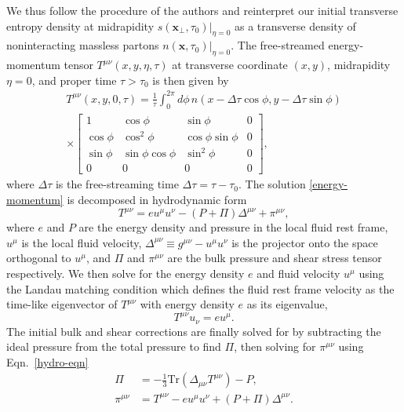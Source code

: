 \documentclass[aps,prc,reprint,amsmath,nofootinbib]{revtex4-1}
\begin{document}
We thus follow the procedure of the authors and reinterpret our initial transverse entropy density at midrapidity $s(\mathbf{x_\perp}, \tau_0)\vert_{\eta=0}$ as a transverse density of noninteracting massless partons $n(\mathbf{x}, \tau_0)\vert_{\eta=0}$.
The free-streamed energy-momentum tensor $T^{\mu\nu}(x, y, \eta, \tau)$ at transverse coordinate $(x, y)$, midrapidity $\eta=0$, and proper time $\tau > \tau_0$ is then given by
\begin{multline}
  \label{energy-momentum}
  T^{\mu\nu}(x, y, 0, \tau) = \frac{1}{\tau} \int_{0}^{2\pi} d\phi\, n(x - \Delta \tau \cos \phi, y - \Delta \tau \sin \phi) \\ \times
  \begin{bmatrix}
    1 & \cos\phi & \sin\phi  & 0\\
    \cos\phi & \cos^2\phi & \cos\phi\sin\phi & 0 \\
    \sin\phi & \sin\phi \cos\phi & \sin^2\phi & 0\\
    0 & 0 & 0 & 0
  \end{bmatrix},
\end{multline}
where $\Delta\tau$ is the free-streaming time $\Delta\tau = \tau - \tau_0$.
The solution \eqref{energy-momentum} is decomposed in hydrodynamic form
\begin{equation}
  \label{hydro-eqn}
  T^{\mu\nu} = e u^\mu u^\nu - (P + \Pi) \Delta^{\mu\nu} + \pi^{\mu\nu},
\end{equation}
where $e$ and $P$ are the energy density and pressure in the local fluid rest frame, $u^\mu$ is the local fluid velocity, ${\Delta^{\mu\nu} \equiv g^{\mu\nu} - u^\mu u^\nu}$ is the projector onto the space orthogonal to $u^\mu$, and $\Pi$ and $\pi^{\mu\nu}$ are the bulk pressure and shear stress tensor respectively.
We then solve for the energy density $e$ and fluid velocity $u^\mu$ using the Landau matching condition which defines the fluid rest frame velocity as the time-like eigenvector of $T^{\mu\nu}$ with energy density $e$ as its eigenvalue,
\begin{equation}
  T^{\mu\nu} u_\nu = e u^\mu.
\end{equation}
The initial bulk and shear corrections are finally solved for by subtracting the ideal pressure from the total pressure to find $\Pi$, then solving for $\pi^{\mu\nu}$ using Eqn.~\eqref{hydro-eqn}
\begin{align}
  \Pi &= -\frac{1}{3} \mathrm{Tr}(\Delta_{\mu\nu} T^{\mu\nu}) - P,\\
  \pi^{\mu\nu} &= T^{\mu\nu} - e u^\mu u^\nu + (P + \Pi) \Delta^{\mu\nu}.
\end{align}
\end{document}
